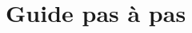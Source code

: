 \documentclass[a4paper, 12pt]{report}
\begin{document}
		\section{}



\chapter{Guide pas à pas}
\thispagestyle{empty}
\thispagestyle{plain}

	\section{}


	\section{}





	\section{}


	\section{}


	\section{}



	\section{}


	\section{}




		
		
\end{document}
